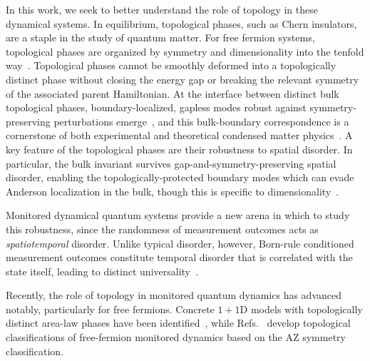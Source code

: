 \documentclass[aps,prb,10pt,twocolumn,superscriptaddress,longbibliography,floatfix]{revtex4-2}
\begin{document}
In this work, we seek to better understand the role of topology in these dynamical systems. In equilibrium, topological phases, such as Chern insulators, are a staple in
the study of quantum matter. For free fermion systems, topological phases are organized by symmetry and dimensionality into the tenfold way~\cite{AltlandZirnbauer1997,SchnyderRyuFurusakiLudwig2008,Kitaev2009,RyuSchnyderFurusakiLudwig2010,ChiuTeoSchnyderRyu2016}.
Topological phases cannot be smoothly deformed into a topologically distinct phase without closing the energy gap or breaking the relevant symmetry of the associated parent Hamiltonian. At the interface between distinct bulk topological phases, boundary-localized, gapless modes robust against symmetry-preserving
perturbations emerge~\cite{Halperin1982,Hatsugai1993,TeoKane2010}, and this bulk-boundary correspondence is a cornerstone of both experimental and theoretical condensed matter physics~\cite{HasanKane2010,QiZhang2011}. A key feature of the topological phases are their robustness to spatial disorder. In particular, the bulk invariant survives gap-and-symmetry-preserving spatial disorder, enabling the topologically-protected boundary modes which can
evade Anderson localization in the bulk, though this is specific to dimensionality~\cite{Halperin1982,EversMirlin2008}.

Monitored dynamical quantum systems provide a new arena in which to study this robustness, since the randomness of measurement outcomes acts as \textit{spatiotemporal} disorder. Unlike typical disorder, however, Born-rule conditioned measurement outcomes constitute temporal disorder that is correlated with the state itself, leading to distinct universality~\cite{JianShapourianBauerLudwig2023,FavaEtAl2023}. 


Recently, the role of topology in monitored quantum dynamics has advanced notably, particularly for free fermions. Concrete $1+1$D models with topologically distinct area-law phases have been identified~\cite{KellsMeidanRomito2023,BehrendsVennBeri2024,PanShapourianJian2025,Oshima2025, yang2026decoding}, while Refs.~\cite{BhuiyanPanJian2026,XiaoKawabata2026} develop topological classifications of free-fermion monitored dynamics based on the AZ symmetry classification.
\end{document}
